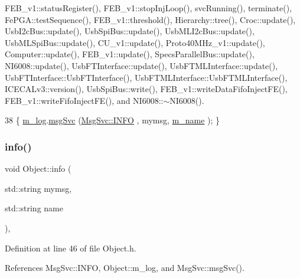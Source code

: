 F\+E\+B\+\_\+v1\+::status\+Register(), F\+E\+B\+\_\+v1\+::stop\+Inj\+Loop(), svc\+Running(), terminate(), Fe\+P\+G\+A\+::test\+Sequence(), F\+E\+B\+\_\+v1\+::threshold(), Hierarchy\+::tree(), Croc\+::update(), Usb\+I2c\+Bus\+::update(), Usb\+Spi\+Bus\+::update(), Usb\+M\+L\+I2c\+Bus\+::update(), Usb\+M\+L\+Spi\+Bus\+::update(), C\+U\+\_\+v1\+::update(), Proto40\+M\+Hz\+\_\+v1\+::update(), Computer\+::update(), F\+E\+B\+\_\+v1\+::update(), Specs\+Parallel\+Bus\+::update(), N\+I6008\+::update(), Usb\+F\+T\+Interface\+::update(), Usb\+F\+T\+M\+L\+Interface\+::update(), Usb\+F\+T\+Interface\+::\+Usb\+F\+T\+Interface(), Usb\+F\+T\+M\+L\+Interface\+::\+Usb\+F\+T\+M\+L\+Interface(), I\+C\+E\+C\+A\+Lv3\+::version(), Usb\+Spi\+Bus\+::write(), F\+E\+B\+\_\+v1\+::write\+Data\+Fifo\+Inject\+F\+E(), F\+E\+B\+\_\+v1\+::write\+Fifo\+Inject\+F\+E(), and N\+I6008\+::$\sim$\+N\+I6008().


\begin{DoxyCode}
38 \{ \hyperlink{classObject_a0d269813dd7ac1f24bc143031e2963f2}{m\_log}.\hyperlink{classMsgSvc_ad25f18047920cc59a314e5098259711c}{msgSvc} (\hyperlink{classMsgSvc_ae671eb7301996cd049d2da8a65925926ad2fcf3f3e734fc41ee097cc23670ce51}{MsgSvc::INFO}    , mymsg, \hyperlink{classObject_a8b83c95c705d2c3ba0d081fe1710f48d}{m\_name} ); \}
\end{DoxyCode}
\mbox{\label{classObject_a1ca123253dfd30fc28b156f521dcbdae}} 
\subsubsection{\texorpdfstring{info()}{info()}\hspace{0.1cm}{\footnotesize\ttfamily [2/2]}}
{\footnotesize\ttfamily void Object\+::info (\begin{DoxyParamCaption}\item[{std\+::string}]{mymsg,  }\item[{std\+::string}]{name }\end{DoxyParamCaption})\hspace{0.3cm}{\ttfamily [inline]}, {\ttfamily [inherited]}}



Definition at line 46 of file Object.\+h.



References Msg\+Svc\+::\+I\+N\+FO, Object\+::m\+\_\+log, and Msg\+Svc\+::msg\+Svc().


